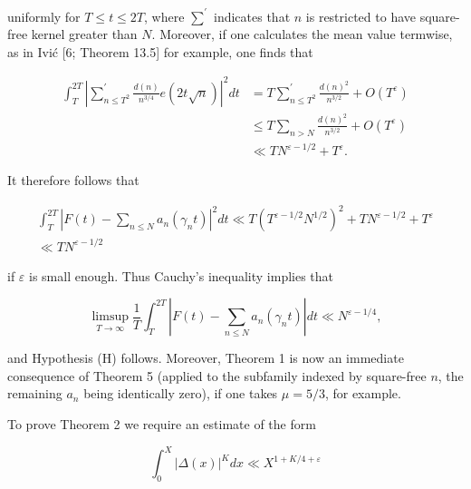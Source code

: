 \documentclass[10pt]{article}
\begin{document}
uniformly for $T \leq t \leq 2 T$, where $\sum^{\prime}$ indicates that $n$ is restricted to have square-free kernel greater than $N$. Moreover, if one calculates the mean value termwise, as in Ivić [6; Theorem 13.5] for example, one finds that

$$
\begin{aligned}
\int_{T}^{2 T}\left|\sum_{n \leq T^{2}}^{\prime} \frac{d(n)}{n^{3 / 4}} e(2 t \sqrt{n})\right|^{2} d t & =T \sum_{n \leq T^{2}}^{\prime} \frac{d(n)^{2}}{n^{3 / 2}}+O\left(T^{\varepsilon}\right) \\
& \leq T \sum_{n>N} \frac{d(n)^{2}}{n^{3 / 2}}+O\left(T^{\varepsilon}\right) \\
& \ll T N^{\varepsilon-1 / 2}+T^{\varepsilon} .
\end{aligned}
$$

It therefore follows that


\begin{gather*}
\int_{T}^{2 T}\left|F(t)-\sum_{n \leq N} a_{n}\left(\gamma_{n} t\right)\right|^{2} d t \ll T\left(T^{\varepsilon-1 / 2} N^{1 / 2}\right)^{2}+T N^{\varepsilon-1 / 2}+T^{\varepsilon}  \tag{5.2}\\
\ll T N^{\varepsilon-1 / 2}
\end{gather*}


if $\varepsilon$ is small enough. Thus Cauchy's inequality implies that

$$
\limsup _{T \rightarrow \infty} \frac{1}{T} \int_{T}^{2 T}\left|F(t)-\sum_{n \leq N} a_{n}\left(\gamma_{n} t\right)\right| d t \ll N^{\varepsilon-1 / 4},
$$

and Hypothesis (H) follows. Moreover, Theorem 1 is now an immediate consequence of Theorem 5 (applied to the subfamily indexed by square-free $n$, the remaining $a_n$ being identically zero), if one takes $\mu=5 / 3$, for example.

To prove Theorem 2 we require an estimate of the form


\begin{equation*}
\int_{0}^{X}|\Delta(x)|^{K} d x \ll X^{1+K / 4+\varepsilon} \tag{5.3}
\end{equation*}
\end{document}
